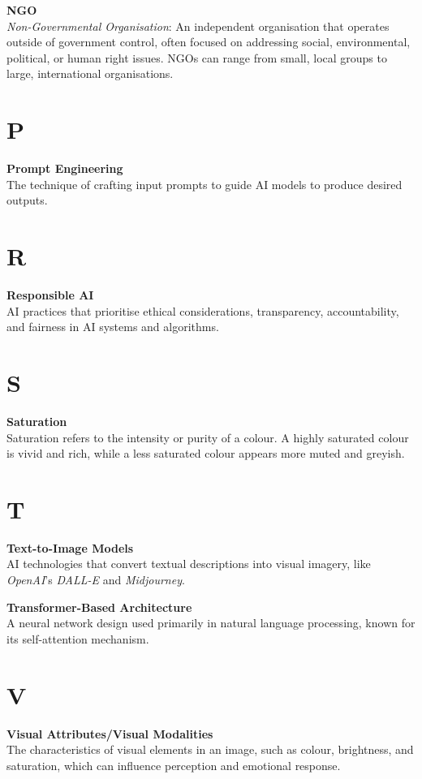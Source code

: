 \vspace{4mm}

\noindent \textbf{NGO}\\
\noindent \textit{Non-Governmental Organisation}: An independent organisation that operates outside of government control, often focused on addressing social, environmental, political, or human right issues. NGOs can range from small, local groups to large, international organisations.

\section*{P}
\noindent \textbf{Prompt Engineering}\\
\noindent The technique of crafting input prompts to guide AI models to produce desired outputs.

\section*{R}
\noindent \textbf{Responsible AI}\\
\noindent AI practices that prioritise ethical considerations, transparency, accountability, and fairness in AI systems and algorithms.

\section*{S}
\noindent \textbf{Saturation}\\
\noindent Saturation refers to the intensity or purity of a colour. A highly saturated colour is vivid and rich, while a less saturated colour appears more muted and greyish.

\section*{T}
\noindent \textbf{Text-to-Image Models}\\
\noindent AI technologies that convert textual descriptions into visual imagery, like \textit{OpenAI}'s \textit{DALL-E} and \textit{Midjourney}.

\vspace{4mm}

\noindent \textbf{Transformer-Based Architecture}\\
\noindent A neural network design used primarily in natural language processing, known for its self-attention mechanism.

\section*{V}
\noindent \textbf{Visual Attributes/Visual Modalities}\\
\noindent The characteristics of visual elements in an image, such as colour, brightness, and saturation, which can influence perception and emotional response.

